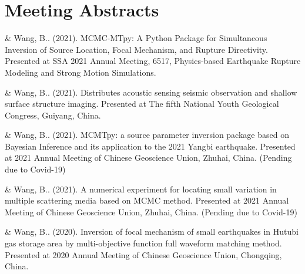 \section{Meeting Abstracts}


\begin{etaremune}

\item \Me \& Wang, B.. (2021). MCMC-MTpy: A Python Package for Simultaneous Inversion of Source Location, Focal Mechanism, and Rupture Directivity. 
Presented at SSA 2021 Annual Meeting, 6517, Physics-based Earthquake Rupture Modeling and Strong Motion Simulations.

\item \Me \& Wang, B.. (2021). Distributes acoustic sensing seismic observation and shallow surface structure imaging. 
Presented at The fifth National Youth Geological Congress, Guiyang, China.
    
\item \Me \& Wang, B.. (2021). MCMTpy: a source parameter inversion package based on Bayesian Inference and its application to the 2021 Yangbi earthquake. 
Presented at 2021 Annual Meeting of Chinese Geoscience Union, Zhuhai, China. (Pending due to Covid-19)
    
\item \Me \& Wang, B.. (2021). A numerical experiment for locating small variation in multiple scattering media based on MCMC method. 
Presented at 2021 Annual Meeting of Chinese Geoscience Union, Zhuhai, China. (Pending due to Covid-19)
    
\item \Me \& Wang, B.. (2020). Inversion of focal mechanism of small earthquakes in Hutubi gas storage area by multi-objective function full waveform matching method. 
Presented at 2020 Annual Meeting of Chinese Geoscience Union, Chongqing, China.
    

\end{etaremune}
